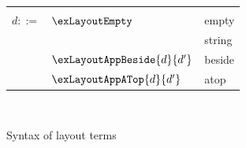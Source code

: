 \begin{figure}
    {\small
    \begin{minipage}[t]{0.48\textwidth}
    \begin{tabularx}{\textwidth}{rL{2.8cm}L{3cm}}
       &&
       \\
       $d ::=$
       &
       $\exLayoutEmpty$
       &
       empty 
       \\
       &
       &
       string 
       \\ 
       &
       $\exLayoutAppBeside{d}{d'}$
       &
       beside 
       \\
       &
       $\exLayoutAppATop{d}{d'}$
       &
       atop 
       \\
       \end{tabularx}
    \end{minipage}%
    \\[3mm]
    }
    \caption{Syntax of layout terms}
\end{figure}